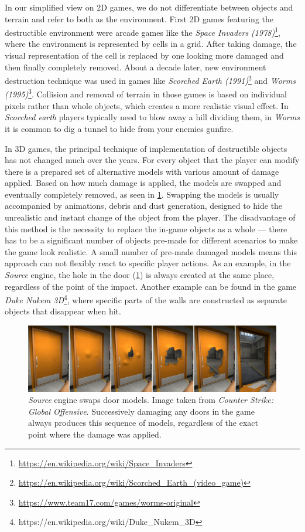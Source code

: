 In our simplified view on 2D games, we do not differentiate between objects and terrain and refer to both as the environment.
First 2D games featuring the destructible environment were arcade games like the \emph{Space Invaders (1978)}\footnote{\url{https://en.wikipedia.org/wiki/Space\_Invaders}}, where the environment is represented by cells in a grid. After taking damage, the visual representation of the cell is replaced by one looking more damaged and then finally completely removed. About a decade later, new environment destruction technique was used in games like \emph{Scorched Earth (1991)}\footnote{\url{https://en.wikipedia.org/wiki/Scorched\_Earth\_(video\_game)}} and \emph{Worms (1995)}\footnote{\url{https://www.team17.com/games/worms-original}}. Collision and removal of terrain in those games is based on individual pixels rather than whole objects, which creates a more realistic visual effect. In \emph{Scorched earth} players typically need to blow away a hill dividing them, in \emph{Worms} it is common to dig a tunnel to hide from your enemies gunfire.

In 3D games, the principal technique of implementation of destructible objects has not changed much over the years. For every object that the player can modify there is a prepared set of alternative models with various amount of damage applied. Based on how much damage is applied, the models are swapped and eventually completely removed, as seen in \cref{fig:doors}. Swapping the models is usually accompanied by animations, debris and dust generation, designed to hide the unrealistic and instant change of the object from the player. The disadvantage of this method is the necessity to replace the in-game objects as a whole --- there has to be a significant number of objects pre-made for different scenarios to make the game look realistic. A small number of pre-made damaged models means this approach can not flexibly react to specific player actions. As an example, in the \emph{Source} engine, the hole in the door (\cref{fig:doors}) is always created at the same place, regardless of the point of the impact. Another example can be found in the game \emph{Duke Nukem 3D}\footnote{https://en.wikipedia.org/wiki/Duke\_Nukem\_3D}, where specific parts of the walls are constructed as separate objects that disappear when hit.

\begin{figure} 
\centering
\includegraphics[width=\textwidth]{img/doors}
\caption{\emph{Source} engine swaps door models. Image taken from \emph{Counter Strike: Global Offensive}. Successively damaging any doors in the game always produces this sequence of models, regardless of the exact point where the damage was applied.}
\label{fig:doors}
\end{figure}


